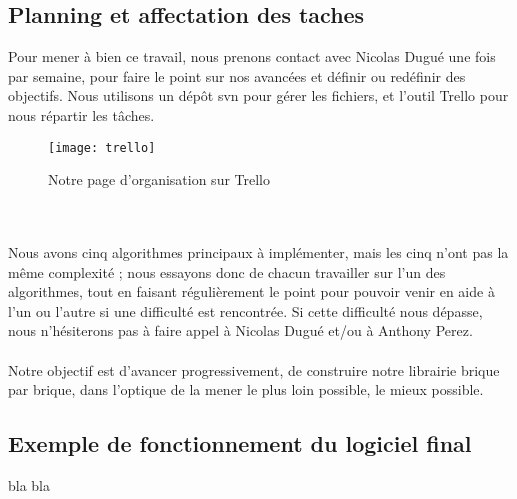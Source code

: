 \begin{titlepage}
\newpage
\begin{center}
\begin{bf}
\section{Planning et affectation des taches}
\end{bf}
\end{center}

\vspace{1cm}
{
Pour mener à bien ce travail, nous prenons contact avec Nicolas Dugué une fois par semaine, pour faire le point sur nos avancées et définir ou redéfinir des objectifs. Nous utilisons un dépôt svn pour gérer les fichiers, et l'outil Trello pour nous répartir les tâches.
\begin{figure}[h]
\centering
\texttt{[image: trello]}
\caption{Notre page d'organisation sur Trello}
\end{figure}
\\ \\
Nous avons cinq algorithmes principaux à implémenter, mais les cinq n'ont pas la même complexité ; nous essayons donc de chacun travailler sur l'un des algorithmes, tout en faisant régulièrement le point pour pouvoir venir en aide à l'un ou l'autre si une difficulté est rencontrée. Si cette difficulté nous dépasse, nous n'hésiterons pas à faire appel à Nicolas Dugué et/ou à Anthony Perez.
\\ \\
Notre objectif est d'avancer progressivement, de construire notre librairie brique par brique, dans l'optique de la mener le plus loin possible, le mieux possible.
}


\newpage
\begin{center}
\begin{bf}
\section{Exemple de fonctionnement du logiciel final}
\end{bf}
\end{center}

\vspace{1cm}
{
bla bla
}



\end{titlepage}
